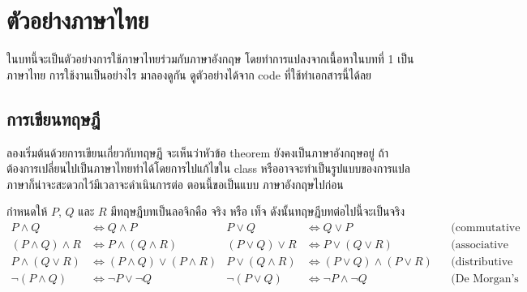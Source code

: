 \chapter{ตัวอย่างภาษาไทย}
\begin{summary}
 ในบทนี้จะเป็นตัวอย่างการใช้ภาษาไทยร่วมกับภาษาอังกฤษ  โดยทำการแปลงจากเนื้อหาในบทที่ 1 เป็นภาษาไทย การใช้งานเป็นอย่างไร มาลองดูกัน  ดูตัวอย่างได้จาก code ที่ใช้ทำเอกสารนี้ได้ลย 
\end{summary}

\section{การเขียนทฤษฎี}

ลองเริ่มต้นด้วยการเขียนเกี่ยวกับทฤษฏี   จะเห็นว่าหัวข้อ theorem ยังคงเป็นภาษาอังกฤษอยู่ ถ้าต้องการเปลี่ยนไปเป็นภาษาไทยทำได้โดยการไปแก้ไขใน class หรืออาจจะทำเป็นรูปแบบของการแปลภาษาก็น่าจะสะดวกไว้มีเวลาจะดำเนินการต่อ ตอนนี้ขอเป็นแบบ ภาษาอังกฤษไปก่อน
\begin{theorem}
  \label{th:logicalgebra}
  กำหนดให้ $P$, $Q$ และ $R$  มีทฤษฎีบทเป็นลอจิกคือ จริง หรือ เท็จ ดังนั้นทฤษฎีบทต่อไปนี้จะเป็นจริง
  \small
  \begin{align*}
    P \land Q &\Leftrightarrow Q \land P &
    P \lor  Q &\Leftrightarrow Q \lor P  &&
    \text{(commutative laws)} \\
    (P \land Q) \land R &\Leftrightarrow P \land (Q \land R) &
    (P \lor Q)  \lor  R &\Leftrightarrow P \lor  (Q \lor  R) &&
    \text{(associative laws)} \\
    P \land (Q \lor  R) &\Leftrightarrow (P \land Q) \lor  (P \land R) &
    P \lor  (Q \land R) &\Leftrightarrow (P \lor  Q) \land (P \lor  R) &&
    \text{(distributive laws)} \\
    \lnot (P \land Q) &\Leftrightarrow \lnot P \lor  \lnot Q &
    \lnot (P \lor  Q) &\Leftrightarrow \lnot P \land \lnot Q &&
    \text{(De Morgan's laws)}
  \end{align*}
\end{theorem}
